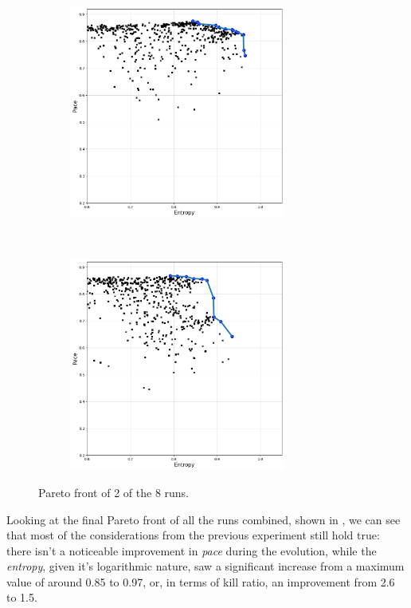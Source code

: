 \begin{figure}[hbtp]
    \centering
    \begin{subfigure}[t]{0.5\textwidth}
        \centering
        \includegraphics[height=7cm]{Images/images/experiment_two/Pareto/pareto_front_population_0.png}
    \end{subfigure}%
    ~ 
    \begin{subfigure}[t]{0.5\textwidth}
        \centering
        \includegraphics[height=7cm]{Images/images/experiment_two/Pareto/pareto_front_population_1.png}
    \end{subfigure}
    \caption{Pareto front of 2 of the 8 runs.}
    \label{fig:ex_two_pareto_populations}
\end{figure}

Looking at the final Pareto front of all the runs combined, shown in , we can see that most of the considerations from the previous experiment still hold true: there isn't a noticeable improvement in \textit{pace} during the evolution, while the \textit{entropy}, given it's logarithmic nature, saw a significant increase from a maximum value of around 0.85 to 0.97, or, in terms of kill ratio, an improvement from 2.6 to 1.5. 

